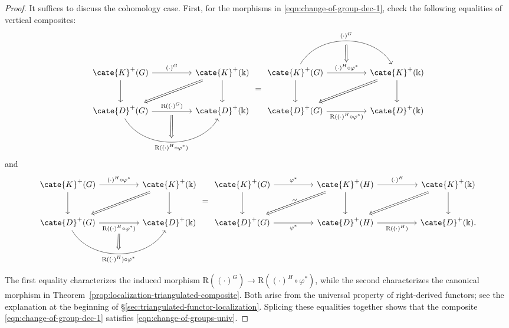 \begin{proof}
	It suffices to discuss the cohomology case. First, for the morphisms in
	\eqref{eqn:change-of-group-dec-1}, check the following equalities of
	vertical composites:
	\[\begin{tikzcd}[column sep=huge, row sep=large]
		\cate{K}^+(G) \arrow[r, "{(\cdot)^G}"] \arrow[d] & \cate{K}^+(\Bbbk) \arrow[d] \arrow[Rightarrow, ld] \\
		\cate{D}^+(G) \arrow[r, "{\mathrm{R}((\cdot)^G)}", ""' {name=D}] \arrow[r, bend right=60, "" {name=U}, "{\mathrm{R}((\cdot)^H \circ \varphi^*)}"'] & \cate{D}^+(\Bbbk) \arrow[Rightarrow, from=D, to=U]
	\end{tikzcd} = \begin{tikzcd}[column sep=huge, row sep=large]
		\cate{K}^+(G) \arrow[r, "{(\cdot)^H \circ \varphi^*}" {name=D}] \arrow[d] \arrow[r, bend left=60, ""' {name=U}, "{(\cdot)^G}"] & \cate{K}^+(\Bbbk) \arrow[d] \arrow[Rightarrow, ld] \\
		\cate{D}^+(G) \arrow[r, "{\mathrm{R}((\cdot)^H \circ \varphi^* ) }"'] & \cate{D}^+(\Bbbk) \arrow[Rightarrow, from=U, to=D]
	\end{tikzcd}\]
and
	\[\begin{tikzcd}[column sep=huge, row sep=large]
		\cate{K}^+(G) \arrow[r, "{(\cdot)^H \circ \varphi^*}"] \arrow[d] & \cate{K}^+(\Bbbk) \arrow[d] \arrow[Rightarrow, ld] \\
		\cate{D}^+(G) \arrow[r, "{\mathrm{R}((\cdot)^H \circ \varphi^* ) }"' {name=U}] \arrow[r, bend right=60, "{\mathrm{R}((\cdot)^H) \circ \varphi^*}"', "" {name=D}] & \cate{D}^+(\Bbbk) \arrow[Rightarrow, from=U, to=D]
	\end{tikzcd} = \begin{tikzcd}[column sep=huge, row sep=large]
		\cate{K}^+(G) \arrow[d] \arrow[r, "{\varphi^*}"] & \cate{K}^+(H) \arrow[d] \arrow[r, "{(\cdot)^H}"] \arrow[Rightarrow, ld, "\sim" sloped] & \cate{K}^+(\Bbbk) \arrow[d] \arrow[Rightarrow, ld] \\
		\cate{D}^+(G) \arrow[r, "{\varphi^*}"'] & \cate{D}^+(H) \arrow[r, "{\mathrm{R}((\cdot)^H)}"'] & \cate{D}^+(\Bbbk).
	\end{tikzcd}\]

	The first equality characterizes the induced morphism
	$\mathrm{R}((\cdot)^G)\to
	\mathrm{R}((\cdot)^H\circ\varphi^*)$, while the second characterizes the
	canonical morphism in
	Theorem~\ref{prop:localization-triangulated-composite}. Both arise from
	the universal property of right-derived functors; see the explanation at
	the beginning of \S\ref{sec:triangulated-functor-localization}. Splicing
	these equalities together shows that the composite
	\eqref{eqn:change-of-group-dec-1} satisfies
	\eqref{eqn:change-of-groups-univ}.
\end{proof}

